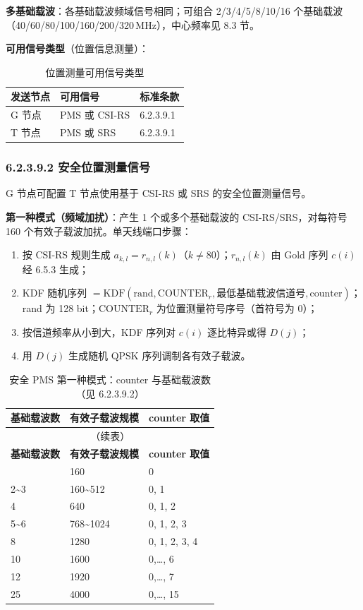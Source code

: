 \documentclass[11pt,a4paper]{ctexart}
\begin{document}
\textbf{多基础载波}：各基础载波频域信号相同；可组合 2/3/4/5/8/10/16 个基础载波（40/60/80/100/160/200/320\,MHz），中心频率见 8.3 节。

\textbf{可用信号类型}（位置信息测量）：
\begin{longtable}{lll}
\caption{位置测量可用信号类型} \\
\toprule
\textbf{发送节点} & \textbf{可用信号} & \textbf{标准条款} \\
\midrule
G 节点 & PMS 或 CSI-RS & 6.2.3.9.1 \\
T 节点 & PMS 或 SRS & 6.2.3.9.1 \\
\bottomrule
\end{longtable}

\subsubsection{6.2.3.9.2 安全位置测量信号}

G 节点可配置 T 节点使用基于 CSI-RS 或 SRS 的安全位置测量信号。

\textbf{第一种模式（频域加扰）}：产生 1 个或多个基础载波的 CSI-RS/SRS，对每符号 160 个有效子载波加扰。单天线端口步骤：
\begin{enumerate}[nosep]
  \item 按 CSI-RS 规则生成 $a_{k,l}=r_{n,l}(k)$（$k{\neq}80$）；$r_{n,l}(k)$ 由 Gold 序列 $c(i)$ 经 6.5.3 生成；
  \item KDF 随机序列 $=\mathrm{KDF}(\mathrm{rand}, \mathrm{COUNTER}_r, \text{最低基础载波信道号}, \mathrm{counter})$；rand 为 128 bit；$\mathrm{COUNTER}_r$ 为位置测量符号序号（首符号为 0）；
  \item 按信道频率从小到大，KDF 序列对 $c(i)$ 逐比特异或得 $D(j)$；
  \item 用 $D(j)$ 生成随机 QPSK 序列调制各有效子载波。
\end{enumerate}

\begin{longtable}{lll}
\caption{安全 PMS 第一种模式：counter 与基础载波数（见 6.2.3.9.2）} \\
\toprule
\textbf{基础载波数} & \textbf{有效子载波规模} & \textbf{counter 取值} \\
\midrule
\endfirsthead
\multicolumn{3}{c}{\small（续表）} \\
\toprule
\textbf{基础载波数} & \textbf{有效子载波规模} & \textbf{counter 取值} \\
\midrule
\endhead
\bottomrule
\endfoot
1 & 160 & 0 \\
2\textasciitilde 3 & 160\textasciitilde 512 & 0, 1 \\
4 & 640 & 0, 1, 2 \\
5\textasciitilde 6 & 768\textasciitilde 1024 & 0, 1, 2, 3 \\
8 & 1280 & 0, 1, 2, 3, 4 \\
10 & 1600 & 0,\ldots, 6 \\
12 & 1920 & 0,\ldots, 7 \\
25 & 4000 & 0,\ldots, 15 \\
\end{longtable}
\end{document}
